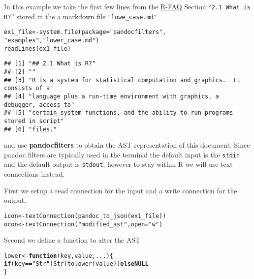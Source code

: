 \documentclass[a4paper]{article}\usepackage[]{graphicx}\usepackage[]{color}
\makeatletter
\newcommand{\hlstr}[1]{\textcolor[rgb]{0.741,0.553,0.545}{#1}}%
\newcommand{\hlopt}[1]{\textcolor[rgb]{0,0,0}{#1}}%
\newcommand{\hlstd}[1]{\textcolor[rgb]{0,0,0}{#1}}%
\newcommand{\hlkwa}[1]{\textcolor[rgb]{0.612,0.125,0.933}{\textbf{#1}}}%
\newcommand{\hlkwb}[1]{\textcolor[rgb]{0.125,0.537,0.125}{#1}}%
\newcommand{\hlkwc}[1]{\textcolor[rgb]{0,0,1}{#1}}%
\newcommand{\hlkwd}[1]{\textcolor[rgb]{0,0,0}{#1}}%
\newenvironment{kframe}{%
 \def\at@end@of@kframe{}%
 \ifinner\ifhmode%
  \def\at@end@of@kframe{\end{minipage}}%
  \begin{minipage}{\columnwidth}%
 \fi\fi%
 \def\FrameCommand##1{\hskip\@totalleftmargin \hskip-\fboxsep
 \colorbox{shadecolor}{##1}\hskip-\fboxsep
     \hskip-\linewidth \hskip-\@totalleftmargin \hskip\columnwidth}%
 \MakeFramed {\advance\hsize-\width
   \@totalleftmargin\z@ \linewidth\hsize
   \@setminipage}}%
 {\par\unskip\endMakeFramed%
 \at@end@of@kframe}
\newenvironment{knitrout}{}{} %
\newcommand{\pkg}[1]{\textbf{#1}}
\newcommand{\proglang}[1]{\textsf{#1}}
\newcommand{\code}[1]{\texttt{#1}}
\makeatother
\begin{document}
In this example we take the first few lines from the 
\href{https://cran.r-project.org/doc/FAQ/R-FAQ}{R-FAQ} Section ``\code{2.1 What is R?}''
stored in the a markdown file \code{"lowe\_case.md"}
\begin{knitrout}
\color{fgcolor}\begin{kframe}
\begin{alltt}
\hlstd{ex1_file} \hlkwb{<-} \hlkwd{system.file}\hlstd{(}\hlkwc{package} \hlstd{=} \hlstr{"pandocfilters"}\hlstd{,}
                        \hlstr{"examples"}\hlstd{,} \hlstr{"lower_case.md"}\hlstd{)}
\hlkwd{readLines}\hlstd{(ex1_file)}
\end{alltt}
\begin{verbatim}
## [1] "## 2.1 What is R?"                                                         
## [2] ""                                                                          
## [3] "R is a system for statistical computation and graphics.  It consists of a" 
## [4] "language plus a run-time environment with graphics, a debugger, access to" 
## [5] "certain system functions, and the ability to run programs stored in script"
## [6] "files."
\end{verbatim}
\end{kframe}
\end{knitrout}

and use \pkg{pandocfilters} to obtain the AST representation of this document.
Since pandoc filters are typically used in the terminal the default
input is the \code{stdin} and the default output is \code{stdout},
however to stay within \proglang{R} we will use text connections
instead. 

First we setup a read connection for the input and a write connection
for the output.
\begin{knitrout}
\color{fgcolor}\begin{kframe}
\begin{alltt}
\hlstd{icon} \hlkwb{<-} \hlkwd{textConnection}\hlstd{(}\hlkwd{pandoc_to_json}\hlstd{(ex1_file))}
\hlstd{ocon} \hlkwb{<-} \hlkwd{textConnection}\hlstd{(}\hlstr{"modified_ast"}\hlstd{,} \hlkwc{open} \hlstd{=} \hlstr{"w"}\hlstd{)}
\end{alltt}
\end{kframe}
\end{knitrout}

Second we define a function to alter the AST
\begin{knitrout}
\color{fgcolor}\begin{kframe}
\begin{alltt}
\hlstd{lower} \hlkwb{<-} \hlkwa{function}\hlstd{(}\hlkwc{key}\hlstd{,} \hlkwc{value}\hlstd{,} \hlkwc{...}\hlstd{) \{}
    \hlkwa{if} \hlstd{(key} \hlopt{==} \hlstr{"Str"}\hlstd{)} \hlkwd{Str}\hlstd{(}\hlkwd{tolower}\hlstd{(value))} \hlkwa{else NULL}
\hlstd{\}}
\end{alltt}
\end{kframe}
\end{knitrout}
\end{document}
